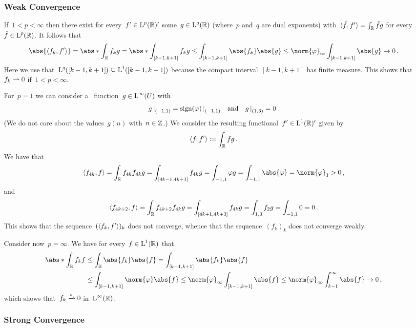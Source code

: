 \subsubsection{Weak Convergence}

If~$1 < p < \infty$ then there exist for every~$f' \in \operatorname{L}^p(\mathbb{R})'$ some~$g \in \operatorname{L}^q(\mathbb{R})$ (where~$p$ and~$q$ are dual exponents) with~$\langle\tilde{f},f'\rangle = \int_{\mathbb{R}} \tilde{f} g$ for every~$\tilde{f} \in \operatorname{L}^p(\mathbb{R})$.
It follows that
\[
        \abs{ \bil{f_k, f'} }
  =     \abs*{ \int_{\Real} f_k g }
  =     \abs*{ \int_{[k-1,k+1]} f_k g }
  \leq  \int_{[k-1,k+1]} \abs{f_k} \abs{g}
  \leq  \norm{\varphi}_\infty \int_{[k-1,k+1]} \abs{g}
  \to   0 \,.
\]
Here we use that~$\operatorname{L}^q([k-1,k+1]) \subseteq \operatorname{L}^1([k-1,k+1])$ because the compact interval~$[k-1,k+1]$ has finite measure.
This shows that~$f_k \rightharpoonup 0$ if~$1 < p < \infty$.

For~$p = 1$ we can consider a~ function~$g \in \operatorname{L}^\infty(U)$ with
\[
    \restrict{g}{(-1,1)}
  = \restrict{\sign(\varphi)}{(-1,1)}
  \quad\text{and}\quad
    \restrict{g}{(1,3)}
  = 0 \,.
\]
(We do not care about the values~$g(n)$ with~$n \in \mathbb{Z}$.)
We consider the resulting functional~$f' \in \operatorname{L}^1(\mathbb{R})'$ given by
\[
  \langle f,f'\rangle
  \coloneqq
  \int_{\mathbb{R}} f g \,.
\]
We have that
\[
    \bil{f_{4k}, f}
  = \int_{\Real} f_{4k} f_{4k} g
  = \int_{[4k-1,4k+1]} f_{4k} g
  = \int_{-1,1} \varphi g
  = \int_{-1,1} \abs{\varphi}
  = \norm{\varphi}_1
  > 0 \,,
\]
and
\[
    \langle f_{4k+2}, f\rangle
  = \int_{\mathbb{R}} f_{4k+2} f_{4k} g
  = \int_{[4k+1,4k+3]} f_{4k} g
  = \int_{1,3} f_2 g
  = \int_{-1,1} 0
  = 0 \,.
\]
This shows that the sequence~$(\langle f_k, f'\rangle)_k$ does not converge, whence that the sequence~$(f_k)_k$ does not converge weakly.

Consider now~$p = \infty$.
We have for every~$f \in \operatorname{L}^1(\mathbb{R})$ that
\begin{align*}
        \abs*{ \int_{\Real} f_k f }
  &\leq \int_{\Real} \abs{f_k} \abs{f}
   =    \int_{[k-1,k+1]} \abs{f_k} \abs{f}  \\
  &\leq \int_{[k-1,k+1]} \norm{\varphi} \abs{f}
   \leq \norm{\varphi}_\infty \int_{[k-1,k+1]} \abs{f}
   \leq \norm{\varphi}_\infty \int_{k-1}^\infty \abs{f}
   \to  0 \,,
\end{align*}
which shows that~$f_k \wtostar 0$ in~$\operatorname{L}^\infty(\mathbb{R})$.




\subsubsection{Strong Convergence}

